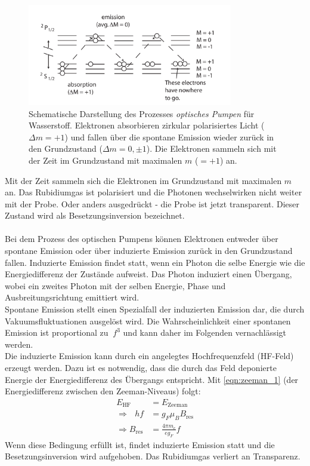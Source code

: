 \begin{figure}
    \centering
    \includegraphics[width=0.8\textwidth]{content/img/optisches_pumpen.png}
    \caption{Schematische Darstellung des Prozesses \textit{optisches Pumpen} für Wasserstoff.
    Elektronen absorbieren zirkular polarisiertes Licht ($\Delta m = +1$) und 
    fallen über die spontane Emission wieder zurück in den Grundzustand ($\Delta m = 0, \pm 1$).
    Die Elektronen sammeln sich mit der Zeit im Grundzustand mit maximalen $m$ ($=+1$) an. \cite{teachspin}
    }
    \label{fig:optisches_pumpen}
\end{figure}
Mit der Zeit sammeln sich die Elektronen im Grundzustand mit maximalen $m$ an.
Das Rubidiumgas ist polarisiert und die Photonen wechselwirken nicht weiter mit der Probe.
Oder anders ausgedrückt - die Probe ist jetzt transparent.
Dieser Zustand wird als Besetzungsinversion bezeichnet.
\\
\\
Bei dem Prozess des optischen Pumpens können Elektronen entweder über spontane Emission oder über induzierte Emission zurück in den Grundzustand fallen.
Induzierte Emission findet statt, wenn ein Photon die selbe Energie wie die Energiedifferenz der Zustände aufweist.
Das Photon induziert einen Übergang, wobei ein zweites Photon mit der selben Energie, Phase und Ausbreitungsrichtung emittiert wird.
\\
Spontane Emission stellt einen Spezialfall der induzierten Emission dar, die durch Vakuumsfluktuationen ausgelöst wird.
Die Wahrscheinlichkeit einer spontanen Emission ist proportional zu $~f^3$ und kann daher im Folgenden vernachlässigt werden.
\\
Die induzierte Emission kann durch ein angelegtes Hochfrequenzfeld (HF-Feld) erzeugt werden.
Dazu ist es notwendig, dass die durch das Feld deponierte Energie der Energiedifferenz des Übergangs entspricht.
Mit \autoref{eqn:zeeman_1} (der Energiedifferenz zwischen den Zeeman-Niveaus) folgt:
\begin{align}
    E_\text{HF} &= E_\text{Zeeman} \\
    \Rightarrow \:\:\: h f &= g_F \mu_B B_\text{res} \\
    \Rightarrow B_\text{res} &= \frac{4\pi m_e}{e g_F} f \label{eqn:resonanzfrequenz}
\end{align}
Wenn diese Bedingung erfüllt ist, findet induzierte Emission statt und die Besetzungsinversion wird aufgehoben.
Das Rubidiumgas verliert an Transparenz.

